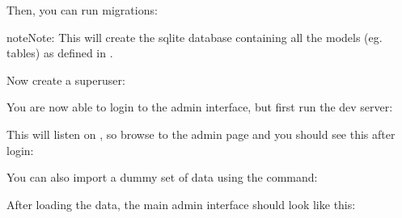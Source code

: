 \documentclass[letterpaper,10pt,openany,oneside,english]{sphinxmanual}
\begin{document}
Then, you can run migrations:

%
\begin{sphinxVerbatim}[commandchars=\\\{\}]
  
\end{sphinxVerbatim}

\begin{sphinxadmonition}{note}{Note:}
This will create the sqlite database  containing all the models
(eg. tables) as defined in .
\end{sphinxadmonition}

Now create a superuser:

%
\begin{sphinxVerbatim}[commandchars=\\\{\}]
  
\end{sphinxVerbatim}

You are now able to login to the admin interface, but first run the dev server:

%
\begin{sphinxVerbatim}[commandchars=\\\{\}]
  
\end{sphinxVerbatim}

This will listen on , so browse to the admin page
 and you should see this after login:

\noindent{}

You can also import a dummy set of data using the  command:

%
\begin{sphinxVerbatim}[commandchars=\\\{\}]
   
\end{sphinxVerbatim}

After loading the data, the main admin interface should look like this:

\noindent{}
\end{document}
